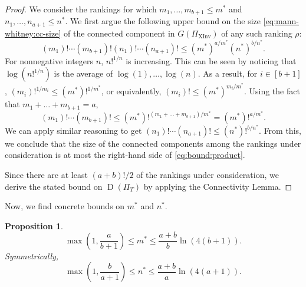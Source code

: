 \documentclass[11pt]{article}
\numberwithin{equation}{section}
\newtheorem{proposition}[theorem]{Proposition}
\theoremstyle{definition}
\theoremstyle{plain}
\newcommand{\ranking}{\rho}
\DeclareMathOperator{\XInv}{XInv}
\DeclareMathOperator{\traces}{D}
\begin{document}
\begin{proof}
We consider the rankings for which $m_1,\dots,m_{b+1}\le m^*$ and $n_1,\dots,n_{a+1}\le n^*$. We first argue the following upper bound on the size \eqref{eq:mann-whitney:cc-size} of the connected component in $G(\Pi_{\XInv})$ of any such ranking $\ranking$:
     \begin{equation}\label{eq:bound:product}
        (m_1)!\cdots (m_{b+1})!(n_1)!\cdots (n_{a+1})! \le (m^*)^{a/m^*}(n^*)^{b/n^*}.
    \end{equation}
For nonnegative integers $n$, $n!^{1/n}$ is increasing. This can be seen by noticing that $\log(n!^{1/n})$ is the average of $\log(1),\dots,\log(n)$. As a result, for $i \in [b+1]$, $(m_i)!^{1/m_i}\le (m^*)!^{1/m^*}$, or equivalently, $(m_i)!\le (m^*)^{m_i/m^*}$. Using the fact that $m_1+\dots +m_{b+1}=a$,
    \begin{equation*}
        (m_1)!\cdots (m_{b+1})!\le (m^*)!^{(m_1+\dots+m_{b+1})/m^*}=(m^*)!^{a/m^*}.
    \end{equation*}
We can apply similar reasoning to get $(n_1)!\cdots (n_{a+1})!\le (n^*)!^{b/n^*}$. From this, we conclude that the size of the connected components among the rankings under consideration is at most the right-hand side of \eqref{eq:bound:product}. 
    
Since there are at least $(a+b)!/2$ of the rankings under consideration, we derive the stated bound on $\traces(\Pi_T)$ by applying the Connectivity Lemma.
\end{proof}

Now, we find concrete bounds on $m^*$ and $n^*$.

\begin{proposition}
    \label{prop:mann-whitney:chunk-size}
    \[\max\left(1,\frac{a}{b+1}\right)\le m^* \le \frac{a+b}{b}\ln(4(b+1)). \]
    Symmetrically,
    \[\max\left(1,\frac{b}{a+1}\right)\le n^* \le \frac{a+b}{a}\ln(4(a+1)). \]
\end{proposition}
\end{document}
